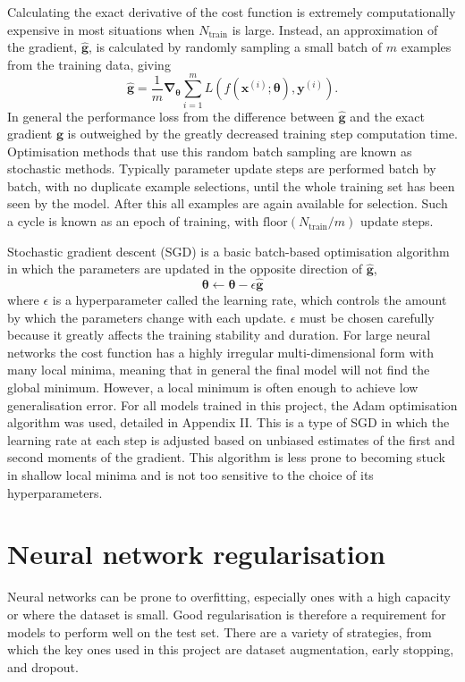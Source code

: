 \documentclass[12pt]{article}
\begin{document}
Calculating the exact derivative of the cost function is extremely computationally expensive in most situations when $N_{\mathrm{train}}$ is large. Instead, an approximation of the gradient, $\hat{\bm{g}}$, is calculated by randomly sampling a small batch of $m$ examples from the training data, giving
\begin{equation}
\hat{\bm{g}}=\frac{1}{m}\bm\nabla_{\bm\theta}\sum_{i=1}^mL(f(\bm{x}^{(i)};\boldsymbol\theta),\bm{y}^{(i)}).
\end{equation}
In general the performance loss from the difference between $\hat{\bm{g}}$ and the exact gradient $\bm{g}$ is outweighed by the greatly decreased training step computation time. Optimisation methods that use this random batch sampling are known as stochastic methods. Typically parameter update steps are performed batch by batch, with no duplicate example selections, until the whole training set has been seen by the model. After this all examples are again available for selection. Such a cycle is known as an epoch of training, with $\mathrm{floor}(N_{\mathrm{train}}/m)$ update steps.

Stochastic gradient descent (SGD) is a basic batch-based optimisation algorithm in which the parameters are updated in the opposite direction of $\hat{\bm{g}}$,
\begin{equation}
\bm\theta\leftarrow\bm\theta-\epsilon\hat{\bm{g}}
\end{equation}
where $\epsilon$ is a hyperparameter called the learning rate, which controls the amount by which the parameters change with each update. $\epsilon$ must be chosen carefully because it greatly affects the training stability and duration. For large neural networks the cost function has a highly irregular multi-dimensional form with many local minima, meaning that in general the final model will not find the global minimum. However, a local minimum is often enough to achieve low generalisation error. For all models trained in this project, the Adam optimisation algorithm was used, detailed in Appendix II. This is a type of SGD in which the learning rate at each step is adjusted based on unbiased estimates of the first and second moments of the gradient. This algorithm is less prone to becoming stuck in shallow local minima and is not too sensitive to the choice of its hyperparameters. 

\section{Neural network regularisation}
Neural networks can be prone to overfitting, especially ones with a high capacity or where the dataset is small. Good regularisation is therefore a requirement for models to perform well on the test set. There are a variety of strategies, from which the key ones used in this project are dataset augmentation, early stopping, and dropout.
\end{document}
